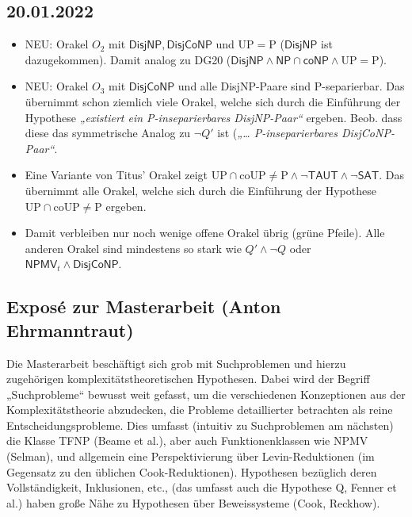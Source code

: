 \documentclass[nofonts]{uebung}
\def\P{\ensuremath{\mathrm{P}}}
\def\UP{\ensuremath{\mathrm{UP}}}
\def\coUP{\ensuremath{\mathrm{coUP}}}
\def\hDisjNP{\ensuremath{\mathsf{DisjNP}}}
\def\hDisjCoNP{\ensuremath{\mathsf{DisjCoNP}}}
\def\hNPcoNP{\ensuremath{\mathsf{NP}{}\cap{}\mathsf{coNP}}}
\begin{document}
\renewcommand{\phi}{\varphi}

\subsection*{20.01.2022}

\begin{itemize}
    \item NEU: Orakel $O_2$ mit $\hDisjNP, \hDisjCoNP$ und $\UP=\P$ ($\hDisjNP$ ist dazugekommen). Damit analog zu DG20 ($\hDisjNP\land \hNPcoNP\land \UP=\P$).
    \item NEU: Orakel $O_3$ mit $\hDisjCoNP$ und alle DisjNP-Paare sind P-separierbar. Das übernimmt schon ziemlich viele Orakel, welche sich durch die Einführung der Hypothese \emph{„existiert ein P-inseparierbares DisjNP-Paar“} ergeben. Beob. dass diese das symmetrische Analog zu $\neg Q'$ ist (\emph{„\ldots{} P-inseparierbares DisjCoNP-Paar“}.
    \item Eine Variante von Titus' Orakel zeigt $\UP\cap \mathrm{coUP} \neq \P\land \neg\mathsf{TAUT}\land \neg\mathsf{SAT}$. Das übernimmt alle Orakel, welche sich durch die Einführung der Hypothese $\UP\cap \coUP \neq \P$ ergeben.
    \item Damit verbleiben nur noch wenige offene Orakel übrig (grüne Pfeile). Alle anderen Orakel sind mindestens so stark wie $Q'\land \neg Q$ oder $\mathsf{NPMV}_t\land \hDisjCoNP$.
\end{itemize}

\clearpage
\thispagestyle{empty}
\subsection*{Exposé zur Masterarbeit (Anton Ehrmanntraut)}

Die Masterarbeit beschäftigt sich grob mit Suchproblemen und hierzu zugehörigen komplexitätstheoretischen Hypothesen.
Dabei wird der Begriff „Suchprobleme“ bewusst weit gefasst, um die verschiedenen Konzeptionen aus der Komplexitätstheorie abzudecken, die Probleme detaillierter betrachten als reine Entscheidungsprobleme.
Dies umfasst (intuitiv zu Suchproblemen am nächsten) die Klasse TFNP (Beame et al.), aber auch Funktionenklassen wie NPMV (Selman), und allgemein eine Perspektivierung über Levin-Reduktionen (im Gegensatz zu den üblichen Cook-Reduktionen). Hypothesen bezüglich deren Vollständigkeit, Inklusionen, etc., (das umfasst auch die Hypothese Q, Fenner et al.) haben große Nähe zu Hypothesen über Beweissysteme (Cook, Reckhow). 
\end{document}
